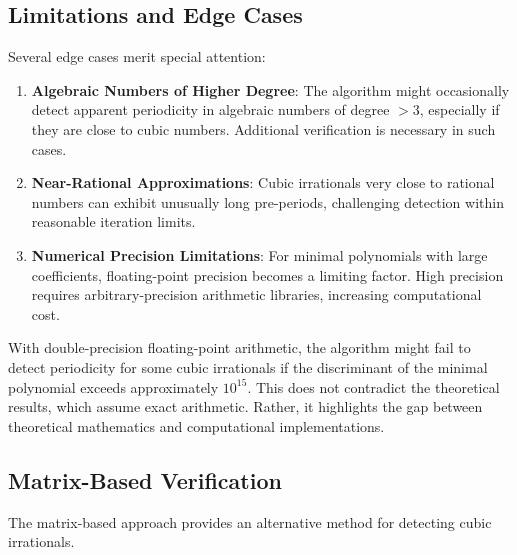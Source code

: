 \subsection{Limitations and Edge Cases}

Several edge cases merit special attention:

\begin{enumerate}
\item \textbf{Algebraic Numbers of Higher Degree}: The algorithm might occasionally detect apparent periodicity in algebraic numbers of degree $> 3$, especially if they are close to cubic numbers. Additional verification is necessary in such cases.

\item \textbf{Near-Rational Approximations}: Cubic irrationals very close to rational numbers can exhibit unusually long pre-periods, challenging detection within reasonable iteration limits.

\item \textbf{Numerical Precision Limitations}: For minimal polynomials with large coefficients, floating-point precision becomes a limiting factor. High precision requires arbitrary-precision arithmetic libraries, increasing computational cost.
\end{enumerate}

With double-precision floating-point arithmetic, the algorithm might fail to detect periodicity for some cubic irrationals if the discriminant of the minimal polynomial exceeds approximately $10^{15}$. This does not contradict the theoretical results, which assume exact arithmetic. Rather, it highlights the gap between theoretical mathematics and computational implementations.

\subsection{Matrix-Based Verification}

The matrix-based approach provides an alternative method for detecting cubic irrationals.

